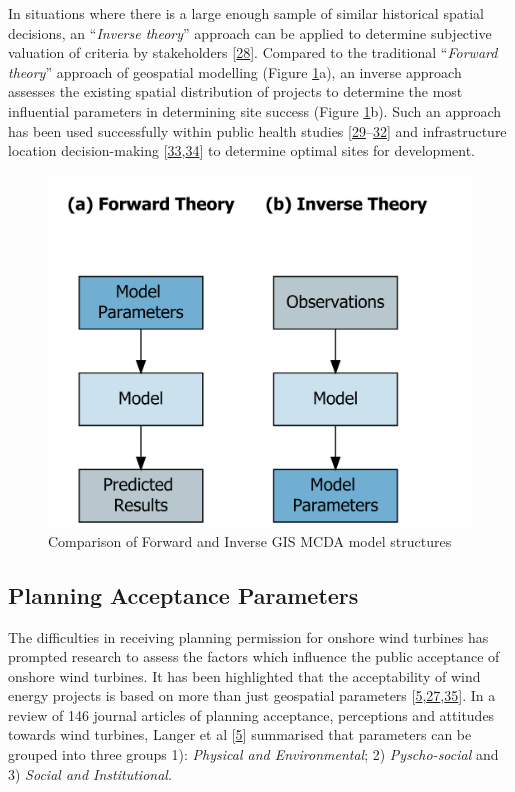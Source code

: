 \documentclass[a4paper,]{article}
\theoremstyle{definition}
\theoremstyle{definition}
\theoremstyle{definition}
\theoremstyle{remark}
\begin{document}
In situations where there is a large enough sample of similar historical
spatial decisions, an ``\emph{Inverse theory}'' approach can be applied
to determine subjective valuation of criteria by stakeholders
{[}\protect\hyperlink{ref-Cirucci2014}{28}{]}. Compared to the
traditional ``\emph{Forward theory}'' approach of geospatial modelling
(Figure \ref{fig:InverseGIS}a), an inverse approach assesses the
existing spatial distribution of projects to determine the most
influential parameters in determining site success (Figure
\ref{fig:InverseGIS}b). Such an approach has been used successfully
within public health studies
{[}\protect\hyperlink{ref-Brody2002}{29}--\protect\hyperlink{ref-Garcia-Ayllon2013}{32}{]}
and infrastructure location decision-making
{[}\protect\hyperlink{ref-USEPA2002}{33},\protect\hyperlink{ref-Cirucci2015}{34}{]}
to determine optimal sites for development.

\begin{figure}[h]

{\centering \includegraphics[width=0.5\linewidth]{_figures/InverseGIS/InverseGIS} 

}

\caption{Comparison of Forward and Inverse GIS MCDA model structures}\label{fig:InverseGIS}
\end{figure}

\subsection{Planning Acceptance
Parameters}\label{planning-acceptance-parameters}

The difficulties in receiving planning permission for onshore wind
turbines has prompted research to assess the factors which influence the
public acceptance of onshore wind turbines. It has been highlighted that
the acceptability of wind energy projects is based on more than just
geospatial parameters
{[}\protect\hyperlink{ref-Langer2016}{5},\protect\hyperlink{ref-VanderHorst2010}{27},\protect\hyperlink{ref-Toke2008}{35}{]}.
In a review of 146 journal articles of planning acceptance, perceptions
and attitudes towards wind turbines, Langer et al
{[}\protect\hyperlink{ref-Langer2016}{5}{]} summarised that parameters
can be grouped into three groups 1): \emph{Physical and Environmental};
2) \emph{Pyscho-social} and 3) \emph{Social and Institutional}.
\end{document}
